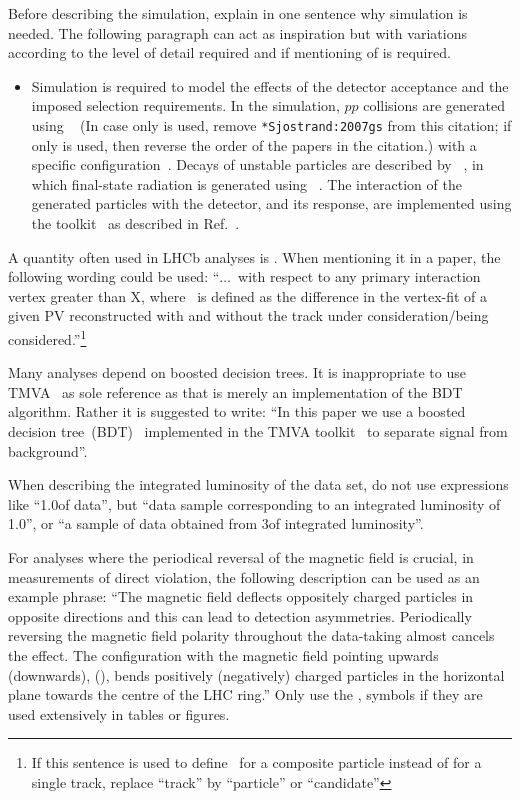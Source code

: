Before describing the simulation, explain in one sentence why simulation is needed.
The following paragraph can act as inspiration but
with variations according to the level of detail required and if
mentioning of \eg \photos is required.
\begin{itemize}
\item Simulation is required to model the effects of the detector acceptance and the
  imposed selection requirements.
  In the simulation, $pp$ collisions are generated using
\pythia~\cite{Sjostrand:2006za,*Sjostrand:2007gs} 
(In case only  is used, remove \verb=*Sjostrand:2007gs= from this citation; if 
only  is used, then reverse the order of the papers in the citation.)
 with a specific \lhcb
configuration~\cite{LHCb-PROC-2010-056}.  Decays of unstable particles
are described by \evtgen~\cite{Lange:2001uf}, in which final-state
radiation is generated using \photos~\cite{Golonka:2005pn}. The
interaction of the generated particles with the detector, and its response,
are implemented using the \geant
toolkit~\cite{Allison:2006ve, *Agostinelli:2002hh} as described in
Ref.~\cite{LHCb-PROC-2011-006}.
\end{itemize}

A quantity often used in LHCb analyses is \chisqip. When mentioning it in 
a paper, the following wording could be used: ``$\ldots$\chisqip\ with respect 
to any primary interaction vertex greater than X, where \chisqip\ is defined as 
the difference in the vertex-fit \chisq of a given PV reconstructed with and
without the track under consideration/being considered.''\footnote{If this
sentence is used to define \chisqip\ for a composite particle instead of 
for a single track, replace ``track'' by ``particle'' or ``candidate''}

Many analyses depend on boosted decision trees. It is inappropriate to
use TMVA~\cite{Hocker:2007ht,*TMVA4} as sole reference as that is
merely an implementation of the BDT algorithm.
Rather it is suggested to write: ``In this paper we use a 
boosted decision tree~(BDT)~\cite{Breiman,AdaBoost} implemented in the TMVA
toolkit~\cite{Hocker:2007ht,*TMVA4} to separate signal from background''. 

When describing the integrated luminosity of the data set, do not use
expressions like ``1.0\invfb of data'', but \eg 
``data sample corresponding to an integrated luminosity of 1.0\invfb'', 
or ``a sample of data obtained from 3\invfb of integrated luminosity''. 

For analyses where the periodical reversal of the magnetic field is crucial, 
\eg in measurements of direct \CP violation, the following description can be
used as an example phrase: 
``The magnetic field deflects oppositely charged particles in opposite
directions and this can lead to detection asymmetries. Periodically
reversing the magnetic field polarity throughout the data-taking almost cancels
the effect. The configuration with the magnetic field pointing upwards (downwards), 
\MagUp (\MagDown), bends positively (negatively) charged particles
in the horizontal plane towards the centre of the LHC ring.''
Only use the \MagUp, \MagDown symbols if they are used extensively in tables or figures.

